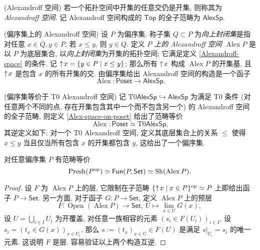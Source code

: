 \begin{definition}
	[label={Alexandroff-space}]
    {(Alexandroff 空间)}
    若一个拓扑空间中开集的任意交仍是开集, 则称其为 \emph{Alexandroff 空间}. 记 Alexandroff 空间构成的 $\mathsf {Top}$ 的全子范畴为 $\mathsf {AlexSp}$.
\end{definition}

\begin{definition}
	[label={Alex-space-on-poset}]
    {(偏序集上的 Alexandroff 空间)}
    设 $P$ 为偏序集. 称子集 $Q\subset P$ 为\emph{向上封闭集}是指对任意 $x\in Q,y\in P$, 若 $x\leq y$, 则 $y\in Q$. 定义 \emph{$P$ 上的 Alexandroff 空间} $\operatorname{Alex} P$ 是以 $P$ 为底层集合, 以\emph{向上封闭集}为开集的拓扑空间; 它满足定义 \ref{Alexandroff-space} 的条件. 记 $\uparrow{\!}{x} = \{y\in P\mid x\leq y\}$; 那么所有 $\uparrow{\!}{x}$ 构成 $\operatorname{Alex} P$ 的开集基, 且 $\uparrow{\!}{x}$ 是包含 $x$ 的所有开集的交. 由偏序集给出 Alexandroff 空间的构造是一个函子
    \[
    \operatorname{Alex}\colon \mathsf {Poset} \to \mathsf {AlexSp}.
    \]
\end{definition}

\begin{prop}
	{(偏序集等价于 T0 Alexandroff 空间)}
	记 $\text{T0}\mathsf {AlexSp}\hookrightarrow\mathsf {AlexSp}$ 为满足 T0 条件 (对任意两个不同的点, 存在开集包含其中一个而不包含另一个) 的 Alexandroff 空间的全子范畴, 则定义 \ref{Alex-space-on-poset} 给出了范畴等价 $$\operatorname{Alex}\colon \mathsf {Poset}\simeq \text{T0}\mathsf {AlexSp},$$ 其逆定义如下:
	对一个 T0 Alexandroff 空间, 定义其底层集合上的关系 $\leq$ 使得 $x\leq y$ 当且仅当所有包含 $x$ 的开集都包含 $y$, 这给出了一个偏序集.
\end{prop}

\begin{prop}
	[label={presheaf-on-poset-equivalent-sheaf-alexsp}]
    {}
    对任意偏序集 $P$ 有范畴等价
    \[
    \operatorname{Presh}(P^{\text{op}})\simeq \mathsf {Fun}(P,\mathsf {Set}) \simeq \operatorname{Sh}(\operatorname{Alex} P).
    \]
\end{prop}
\begin{proof}
	设 $F$ 为 $\operatorname{Alex}P$ 上的层, 它限制在子范畴 $\{\uparrow{\!}{x}\mid x\in P\}^{\text{op}} \simeq P$ 上即给出函子 $P\to\mathsf {Set}$.
	另一方面, 对于函子 $G\colon P\to\mathsf {Set}$,
	定义 $\operatorname{Alex} P$ 上的预层
	$$
	F\colon\operatorname{Open}(\operatorname{Alex}P)\to\mathsf {Set},\ U\mapsto \operatorname{lim}_{x\in U}G(x),
	$$
	设 $U=\bigcup_{i\in I} U_i$ 为开覆盖, 对任意一族相容的元素 $(s_i\in F(U_i))_{i\in I}$,
	设 $s_i = (t_x\in G(x))_{x\in U_i}$,
	那么 $s:=(t_x)_{x\in U}\in F(U)$ 是满足 $s|_{U_i} = s_i$ 的唯一元素. 这说明 $F$ 是层.
	容易验证以上两个构造互逆.
\end{proof}

